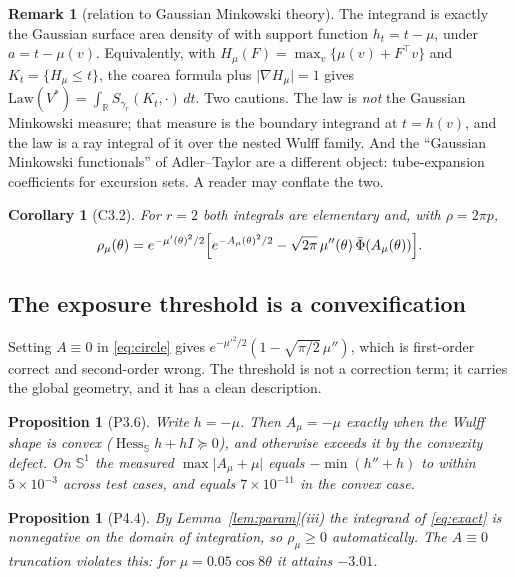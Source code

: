 \documentclass[11pt]{article}
\newtheorem{proposition}[theorem]{Proposition}
\newtheorem{corollary}[theorem]{Corollary}
\theoremstyle{definition}
\newtheorem{remark}[theorem]{Remark}
\DeclareMathOperator{\Hess}{Hess}
\newcommand{\R}{\mathbb{R}}
\newcommand{\Sph}{\mathbb{S}}
\begin{document}
\begin{remark}[relation to Gaussian Minkowski theory]
The integrand is exactly the Gaussian surface area density of \cite{HXZ} with
support function $h_{t}=t-\mu$, under $a=t-\mu(v)$. Equivalently, with
$H_{\mu}(F)=\max_{v}\{\mu(v)+F^{\top}v\}$ and $K_{t}=\{H_{\mu}\le t\}$, the
coarea formula plus $\lvert\nabla H_{\mu}\rvert=1$ gives
$\mathrm{Law}(V^{*})=\int_{\R}S_{\gamma_{r}}(K_{t},\cdot)\,dt$. Two cautions.
The law is \emph{not} the Gaussian Minkowski measure; that measure is the
boundary integrand at $t=h(v)$, and the law is a ray integral of it over the
nested Wulff family. And the ``Gaussian Minkowski functionals'' of
Adler--Taylor \cite{AdlerTaylor} are a different object: tube-expansion
coefficients for excursion sets. A reader may conflate the two.
\end{remark}

\begin{corollary}[\textsf{C3.2}]\label{cor:circle}
For $r=2$ both integrals are elementary and, with $\rho=2\pi p$,
\begin{equation}\label{eq:circle}
  \rho_{\mu}(\theta)=e^{-\mu'(\theta)^{2}/2}
  \Bigl[e^{-A_{\mu}(\theta)^{2}/2}
  -\sqrt{2\pi}\,\mu''(\theta)\,\bar\Phi(A_{\mu}(\theta))\Bigr].
\end{equation}
\end{corollary}

\subsection{The exposure threshold is a convexification}

Setting $A\equiv0$ in \eqref{eq:circle} gives
$e^{-\mu'^{2}/2}(1-\sqrt{\pi/2}\,\mu'')$, which is first-order correct and
second-order wrong. The threshold is not a correction term; it carries the
global geometry, and it has a clean description.

\begin{proposition}[\textsf{P3.6}]\label{prop:convexify}
Write $h=-\mu$. Then $A_{\mu}=-\mu$ exactly when the Wulff shape is convex
\textup{(}$\Hess_{\Sph}h+hI\succeq0$\textup{)}, and otherwise exceeds it by the
convexity defect. On $\Sph^{1}$ the measured $\max\lvert A_{\mu}+\mu\rvert$
equals $-\min(h''+h)$ to within $5\times10^{-3}$ across test cases, and equals
$7\times10^{-11}$ in the convex case.
\end{proposition}

\begin{proposition}[\textsf{P4.4}]\label{prop:nonneg}
By Lemma~\ref{lem:param}(iii) the integrand of \eqref{eq:exact} is nonnegative
on the domain of integration, so $\rho_{\mu}\ge0$ automatically. The $A\equiv0$
truncation violates this: for $\mu=0.05\cos8\theta$ it attains $-3.01$.
\end{proposition}
\end{document}

